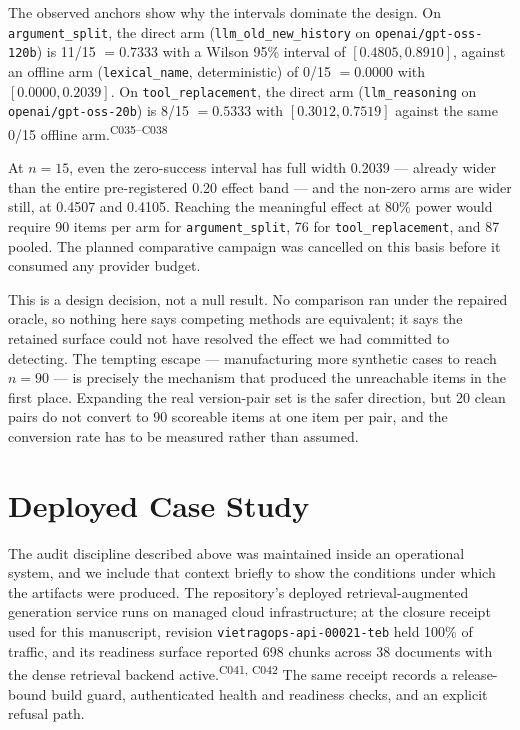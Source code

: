 \documentclass[11pt]{article}
\newcommand{\ledger}[1]{\textsuperscript{\textsf{\scriptsize #1}}}
\newcommand{\dfam}[1]{\texttt{#1}}
\begin{document}
The observed anchors show why the intervals dominate the design. On
\dfam{argument\_split}, the direct arm (\texttt{llm\_old\_new\_history} on
\texttt{openai/gpt-oss-120b}) is 11/15 $=0.7333$ with a Wilson 95\% interval
of $[0.4805, 0.8910]$, against an offline arm (\texttt{lexical\_name},
deterministic) of 0/15 $=0.0000$ with $[0.0000, 0.2039]$. On
\dfam{tool\_replacement}, the direct arm (\texttt{llm\_reasoning} on
\texttt{openai/gpt-oss-20b}) is 8/15 $=0.5333$ with $[0.3012, 0.7519]$ against
the same 0/15 offline arm.\ledger{C035--C038}

At $n=15$, even the zero-success interval has full width 0.2039 --- already
wider than the entire pre-registered 0.20 effect band --- and the non-zero arms
are wider still, at 0.4507 and 0.4105. Reaching the meaningful effect at 80\%
power would require 90 items per arm for \dfam{argument\_split}, 76 for
\dfam{tool\_replacement}, and 87 pooled. The planned comparative campaign was
cancelled on this basis before it consumed any provider budget.

This is a design decision, not a null result. No comparison ran under the
repaired oracle, so nothing here says competing methods are equivalent; it
says the retained surface could not have resolved the effect we had committed
to detecting. The tempting escape --- manufacturing more synthetic cases to
reach $n=90$ --- is precisely the mechanism that produced the unreachable
items in the first place. Expanding the real version-pair set is the safer
direction, but 20 clean pairs do not convert to 90 scoreable items at one item
per pair, and the conversion rate has to be measured rather than assumed.

\section{Deployed Case Study}

The audit discipline described above was maintained inside an operational
system, and we include that context briefly to show the conditions under which
the artifacts were produced. The repository's deployed retrieval-augmented
generation service runs on managed cloud infrastructure; at the closure
receipt used for this manuscript, revision \texttt{vietragops-api-00021-teb}
held 100\% of traffic, and its readiness surface reported 698 chunks across 38
documents with the dense retrieval backend active.\ledger{C041, C042} The same
receipt records a release-bound build guard, authenticated health and
readiness checks, and an explicit refusal path.
\end{document}
